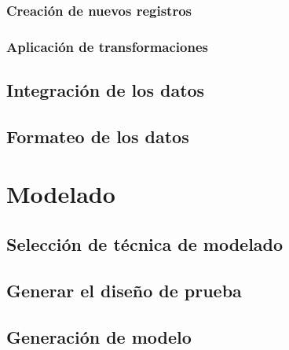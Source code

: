 \documentclass[11pt,a4paper]{tesis}
\begin{document}
\subsection{Creación de nuevos registros} %

\subsection{Aplicación de transformaciones}

\section{Integración de los datos}\label{tablon_integrado}

\section{Formateo de los datos}


\chapter{Modelado}
\section{Selección de técnica de modelado}

\section{Generar el diseño de prueba}
\label{conjunto_datos}
\section{Generación de modelo}\label{generacion_modelos}
%


\end{document}
